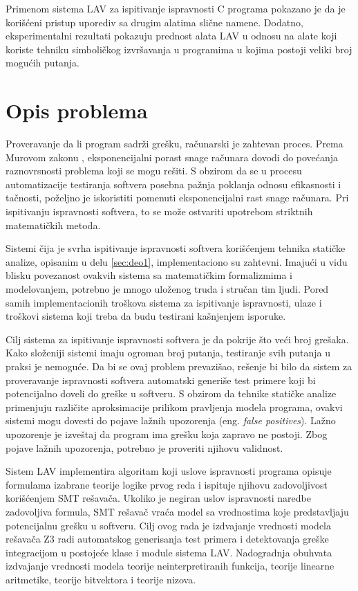 \documentclass[12pt,oneside]{memoir}
\begin{document}
\par
Primenom sistema LAV za ispitivanje ispravnosti C programa pokazano je da je korišćeni pristup uporediv sa drugim alatima slične namene. Dodatno, eksperimentalni rezultati pokazuju prednost alata LAV u odnosu na alate koji koriste tehniku simboličkog izvršavanja u programima u kojima postoji veliki broj mogućih putanja. 

\section{Opis problema} \label{sec:deo3}
Proveravanje da li program sadrži grešku, računarski je zahtevan proces. Prema Murovom zakonu \cite{Moore}, eksponencijalni porast snage računara dovodi do povećanja raznovrsnosti problema koji se mogu rešiti. 
S obzirom da se u procesu automatizacije testiranja softvera posebna pažnja poklanja odnosu efikasnosti i tačnosti, poželjno je iskoristiti pomenuti eksponencijalni rast snage računara. Pri ispitivanju ispravnosti softvera, to se može ostvariti upotrebom striktnih matematičkih metoda.
\par
Sistemi čija je svrha ispitivanje ispravnosti softvera korišćenjem tehnika statičke analize, opisanim u delu \ref{sec:deo1}, implementaciono su zahtevni. Imajući u vidu blisku povezanost ovakvih sistema sa matematičkim formalizmima i modelovanjem, potrebno je mnogo uloženog truda i stručan tim ljudi. Pored samih implementacionih troškova sistema za ispitivanje ispravnosti, ulaze i troškovi sistema koji treba da budu testirani kašnjenjem isporuke.
\par 
Cilj sistema za ispitivanje ispravnosti softvera je da pokrije što veći broj grešaka. Kako složeniji sistemi imaju ogroman broj putanja, testiranje svih putanja u praksi je nemoguće. Da bi se ovaj problem prevazišao, rešenje bi bilo da sistem za proveravanje ispravnosti softvera automatski generiše test primere koji bi potencijalno doveli do greške u softveru. S obzirom da tehnike statičke analize primenjuju različite aproksimacije prilikom pravljenja modela programa, ovakvi sistemi mogu dovesti do pojave lažnih upozorenja (eng. \textit{false positives}). Lažno upozorenje je izveštaj da program ima grešku koja zapravo ne postoji. Zbog pojave lažnih upozorenja, potrebno je proveriti njihovu validnost.
\par
Sistem LAV implementira algoritam koji uslove ispravnosti programa opisuje formulama izabrane teorije logike prvog reda i ispituje njihovu zadovoljivost korišćenjem SMT rešavača. Ukoliko je negiran uslov ispravnosti naredbe zadovoljiva formula, SMT rešavač vraća model sa vrednostima koje predstavljaju potencijalnu grešku u softveru. Cilj ovog rada je izdvajanje vrednosti modela rešavača Z3 radi automatskog generisanja test primera i detektovanja greške integracijom u postojeće klase i module sistema LAV. Nadogradnja obuhvata izdvajanje vrednosti modela teorije neinterpretiranih funkcija, teorije linearne aritmetike, teorije bitvektora i teorije nizova.
\end{document}
